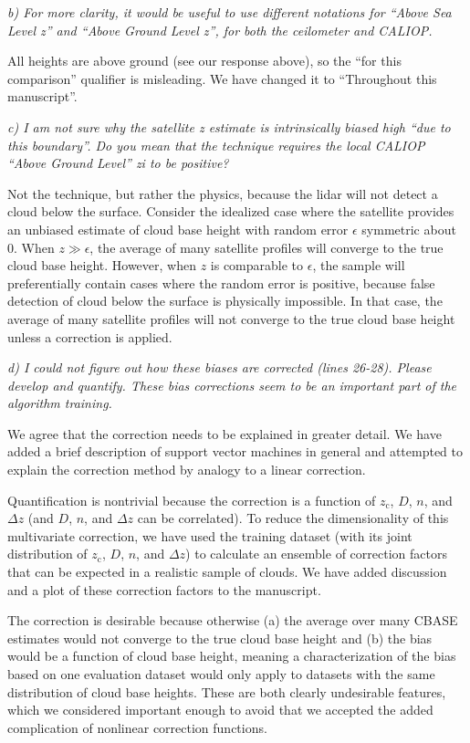 \documentclass[12pt,a4paper]{responses}
\begin{document}
\textit{b) For more clarity,  it would be
useful  to  use  different  notations  for  “Above  Sea  Level  z”  and  “Above  Ground  Level
z”, for both the ceilometer and CALIOP.} 

All heights are above ground (see our response above), so the ``for this
comparison'' qualifier is misleading.  We have changed it to ``Throughout this
manuscript''. 

\textit{c) I am not sure why the satellite z estimate
is intrinsically biased high “due to this boundary”.   Do you mean that the technique
requires the local CALIOP “Above Ground Level” zi to be positive?} 

Not the technique, but rather the physics, because the lidar will not detect a
cloud below the surface.  Consider the idealized case where the
satellite provides an unbiased estimate of cloud base height with random error
$\epsilon$ symmetric about 0.  When $z\gg\epsilon$, the average of many satellite profiles will
converge to the true cloud base height.  However, when $z$ is comparable to
$\epsilon$, the sample will preferentially contain cases where the random error
is positive, because false detection of cloud below the surface is physically
impossible.  In that case, the average of many satellite profiles will not
converge to the true cloud base height unless a correction is applied.

\textit{d) I could not figure
out how these biases are corrected (lines 26-28). Please develop and quantify. These
bias corrections seem to be an important part of the algorithm training.}

We agree that the correction needs to be explained in greater detail.  We have
added a brief description of support vector machines in general and attempted to
explain the correction method by analogy to a linear correction.  

Quantification is nontrivial because the correction is a function of $z_\text{c}$, $D$,
$n$, and $\Delta z$ (and $D$, $n$, and $\Delta z$ can be correlated).  To
reduce the dimensionality of this multivariate correction, we have used the
training dataset (with its joint distribution of $z_\text{c}$, $D$, $n$, and
$\Delta z$) to calculate an ensemble of correction factors that can be expected
in a realistic sample of clouds.  We have added discussion and a plot of these
correction factors to the manuscript.

The correction is desirable because otherwise (a) the average over many CBASE
estimates would not converge to the true cloud base height and (b) the bias
would be a function of cloud base height, meaning a characterization of the bias
based on one evaluation dataset would only apply to datasets with the same
distribution of cloud base heights.  These are both clearly undesirable
features, which we considered important enough to avoid that we accepted the
added complication of nonlinear correction functions.
\end{document}
